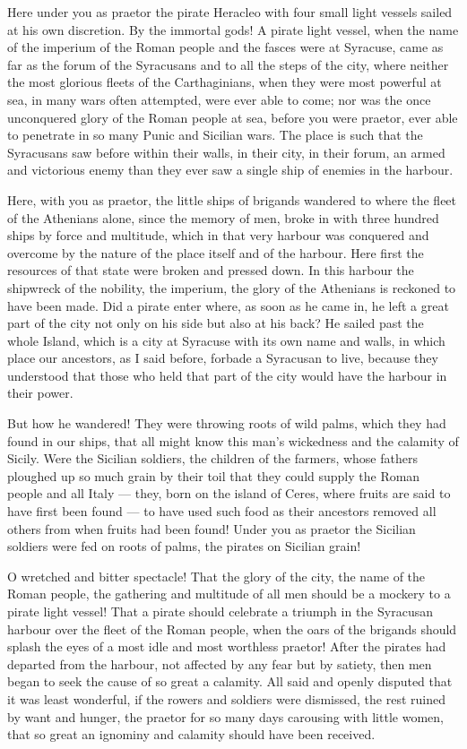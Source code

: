  Here under you as praetor the pirate Heracleo with four small light vessels sailed at his own discretion. By the immortal gods! A pirate light vessel, when the name of the imperium of the Roman people and the fasces were at Syracuse, came as far as the forum of the Syracusans and to all the steps of the city, where neither the most glorious fleets of the Carthaginians, when they were most powerful at sea, in many wars often attempted, were ever able to come; nor was the once unconquered glory of the Roman people at sea, before you were praetor, ever able to penetrate in so many Punic and Sicilian wars. The place is such that the Syracusans saw before within their walls, in their city, in their forum, an armed and victorious enemy than they ever saw a single ship of enemies in the harbour.

 Here, with you as praetor, the little ships of brigands wandered to where the fleet of the Athenians alone, since the memory of men, broke in with three hundred ships by force and multitude, which in that very harbour was conquered and overcome by the nature of the place itself and of the harbour. Here first the resources of that state were broken and pressed down. In this harbour the shipwreck of the nobility, the imperium, the glory of the Athenians is reckoned to have been made. Did a pirate enter where, as soon as he came in, he left a great part of the city not only on his side but also at his back? He sailed past the whole Island, which is a city at Syracuse with its own name and walls, in which place our ancestors, as I said before, forbade a Syracusan to live, because they understood that those who held that part of the city would have the harbour in their power.

 But how he wandered! They were throwing roots of wild palms, which they had found in our ships, that all might know this man's wickedness and the calamity of Sicily. Were the Sicilian soldiers, the children of the farmers, whose fathers ploughed up so much grain by their toil that they could supply the Roman people and all Italy --- they, born on the island of Ceres, where fruits are said to have first been found --- to have used such food as their ancestors removed all others from when fruits had been found! Under you as praetor the Sicilian soldiers were fed on roots of palms, the pirates on Sicilian grain!

 O wretched and bitter spectacle! That the glory of the city, the name of the Roman people, the gathering and multitude of all men should be a mockery to a pirate light vessel! That a pirate should celebrate a triumph in the Syracusan harbour over the fleet of the Roman people, when the oars of the brigands should splash the eyes of a most idle and most worthless praetor! After the pirates had departed from the harbour, not affected by any fear but by satiety, then men began to seek the cause of so great a calamity. All said and openly disputed that it was least wonderful, if the rowers and soldiers were dismissed, the rest ruined by want and hunger, the praetor for so many days carousing with little women, that so great an ignominy and calamity should have been received.

